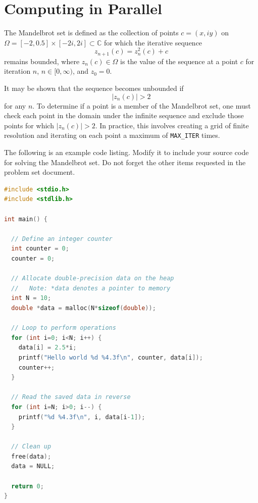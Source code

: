 \documentclass[letterpaper,10pt]{article}
\begin{document}
\section{Computing in Parallel}


The Mandelbrot set is defined as the collection of points $c=(x,iy)$ on $\Omega=[-2,0.5]\times[-2i,2i]\subset\mathbb{C}$ for which the iterative sequence
\begin{equation*}
  z_{n+1}(c) =z_n^2(c) + c
\end{equation*}
remains bounded, where $z_n(c) \in\Omega$ is the value of the sequence at a point $c$ for iteration $n$, $n\in[0,\infty)$, and $z_0=0$.

It may be shown that the sequence becomes unbounded if
\begin{equation*}
  |z_n(c)| > 2
\end{equation*}
for any $n$. To determine if a point is a member of the Mandelbrot set, one must check each point in the domain under the infinite sequence and exclude those points for which $|z_n(c)|>2$. In practice, this involves creating a grid of finite resolution and iterating on each point a maximum of \texttt{MAX\_ITER} times.


The following is an example code listing. Modify it to include your source code for solving the Mandelbrot set. Do not forget the other items requested in the problem set document.
{\small\begin{lstlisting}[language=c,frame=single]
#include <stdio.h>
#include <stdlib.h>

int main() {

  // Define an integer counter
  int counter = 0;
  counter = 0;

  // Allocate double-precision data on the heap
  //   Note: *data denotes a pointer to memory
  int N = 10;
  double *data = malloc(N*sizeof(double));

  // Loop to perform operations
  for (int i=0; i<N; i++) {
    data[i] = 2.5*i;
    printf("Hello world %d %4.3f\n", counter, data[i]);
    counter++; 
  }

  // Read the saved data in reverse
  for (int i=N; i>0; i--) {
    printf("%d %4.3f\n", i, data[i-1]);
  }

  // Clean up
  free(data);
  data = NULL;
  
  return 0;
}
\end{lstlisting}}
\end{document}
